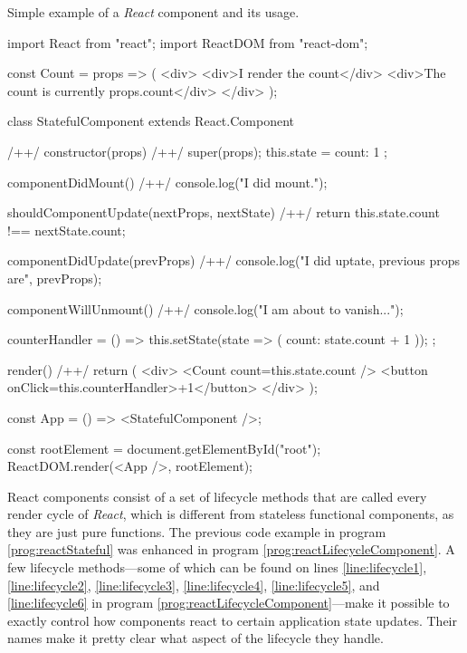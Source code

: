 \begin{program}
\caption{Simple example of a \emph{React} component and its usage.} 
\label{prog:reactLifecycleComponent}
\begin{JsCode}
import React from "react";
import ReactDOM from "react-dom";

const Count = props => (
  <div>
    <div>I render the count</div>
    <div>The count is currently {props.count}</div>
  </div>
);

class StatefulComponent extends React.Component { /+\label{line:extendedStatefulComponent}+/
  constructor(props) { /+\label{line:lifecycle1}+/
    super(props);
    this.state = {
      count: 1
    };
  }

  componentDidMount() { /+\label{line:lifecycle2}+/
    console.log("I did mount.");
  }

  shouldComponentUpdate(nextProps, nextState) { /+\label{line:lifecycle3}+/
    return this.state.count !== nextState.count;
  }

  componentDidUpdate(prevProps) { /+\label{line:lifecycle4}+/
    console.log("I did uptate, previous props are", prevProps);
  }

  componentWillUnmount() { /+\label{line:lifecycle5}+/
    console.log("I am about to vanish...");
  }

  counterHandler = () => {
    this.setState(state => ({ count: state.count + 1 }));
  };

  render() { /+\label{line:lifecycle6}+/
    return (
      <div>
        <Count count={this.state.count} />
        <button onClick={this.counterHandler}>+1</button>
      </div>
    );
  }
}
  
const App = () => <StatefulComponent />;

const rootElement = document.getElementById("root");
ReactDOM.render(<App />, rootElement);  
\end{JsCode}
\end{program}

React components consist of a set of lifecycle methods that are called every render cycle of \emph{React}, which is different from stateless functional components, as they are just pure functions. The previous code example in program \ref{prog:reactStateful} was enhanced in program \ref{prog:reactLifecycleComponent}. A few lifecycle methods---some of which can be found on lines \ref{line:lifecycle1}, \ref{line:lifecycle2}, \ref{line:lifecycle3}, \ref{line:lifecycle4}, \ref{line:lifecycle5}, and \ref{line:lifecycle6} in program \ref{prog:reactLifecycleComponent}---make it possible to exactly control how components react to certain application state updates. Their names make it pretty clear what aspect of the lifecycle they handle.


